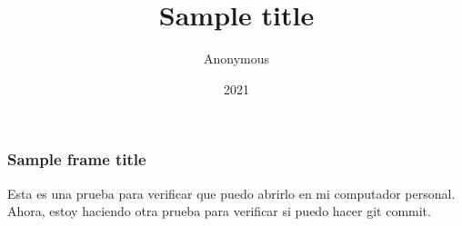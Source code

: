 \documentclass{beamer}
\title{Sample title}
\author{Anonymous}
\institute{Overleaf}
\date{2021}
\begin{document}
\frame{\titlepage}    

\begin{frame}
\frametitle{Sample frame title}
Esta es una prueba para verificar que puedo abrirlo en mi computador personal. Ahora, estoy haciendo otra prueba para verificar si puedo hacer git commit.
\end{frame}
\end{document}
